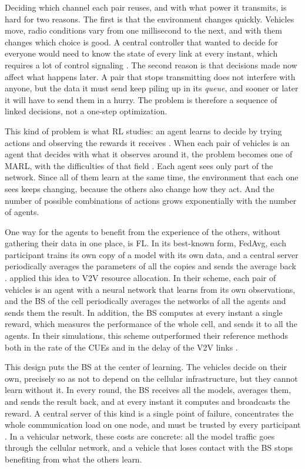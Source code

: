 Deciding which channel each pair reuses, and with what power it transmits, is hard for two reasons. The
first is that the environment changes quickly. Vehicles move, radio conditions vary from one millisecond to
the next, and with them changes which choice is good. A central controller that wanted to decide for
everyone would need to know the state of every link at every instant, which requires a lot of control
signaling \cite{li+22fedmarl}. The second reason is that decisions made now affect what happens later. A pair
that stops transmitting does not interfere with anyone, but the data it must send keep piling up in its
\emph{queue}, and sooner or later it will have to send them in a hurry. The problem is therefore a sequence
of linked decisions, not a one-step optimization.

This kind of problem is what \ac{RL} studies: an agent learns to decide by trying actions and observing the
rewards it receives \cite{sutton+18rl}. When each pair of vehicles is an agent that decides with what it
observes around it, the problem becomes one of \ac{MARL}, with the difficulties of that field
\cite{gronauer+22marlsurvey}. Each agent sees only part of the network. Since all of them
learn at the same time, the environment that each one sees keeps changing, because the others also change
how they act. And the number of possible combinations of actions grows exponentially with the number of
agents.

One way for the agents to benefit from the experience of the others, without gathering their data in one
place, is \ac{FL}. In its best-known form, \ac{FedAvg}, each participant trains its own copy of a model with
its own data, and a central server periodically averages the parameters of all the copies and sends the
average back \cite{mcmahan+17fedavg}. \citet{li+22fedmarl} applied this idea to \ac{V2V} resource
allocation. In their scheme, each pair of vehicles is an agent with a neural network that learns from its
own observations, and the \ac{BS} of the cell periodically averages the networks of all the agents and
sends them the result. In addition, the \ac{BS} computes at every instant a single reward, which measures
the performance of the whole cell, and sends it to all the agents. In their simulations, this scheme
outperformed their reference methods both in the rate of the \acp{CUE} and in the delay of the \ac{V2V}
links \cite{li+22fedmarl}.

This design puts the \ac{BS} at the center of learning. The vehicles decide on their own, precisely so as
not to depend on the cellular infrastructure, but they cannot learn without it. In every round, the \ac{BS}
receives all the models, averages them, and sends the result back, and at every instant it computes and
broadcasts the reward. A central server of this kind is a single point of failure, concentrates the whole
communication load on one node, and must be trusted by every participant \cite{kairouz+21advances,ge+24dfl}.
In a vehicular network, these costs are concrete: all the model traffic goes through the cellular network,
and a vehicle that loses contact with the \ac{BS} stops benefiting from what the others learn.

